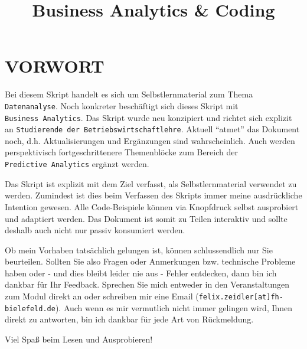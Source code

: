 \documentclass[
  letterpaper,
  DIV=11]{scrreprt}
\title{Business Analytics \& Coding}
\author{}
\date{}
\renewcommand*\contentsname{Inhaltsverzeichnis}
\newcommand\contentsname{Inhaltsverzeichnis}
\begin{document}
\maketitle
\ifdefined\Shaded\renewenvironment{Shaded}{\begin{tcolorbox}[interior hidden, enhanced, frame hidden, breakable, boxrule=0pt, borderline west={3pt}{0pt}{shadecolor}, sharp corners]}{\end{tcolorbox}}\fi

\renewcommand*\contentsname{Inhaltsverzeichnis}
{
\hypersetup{linkcolor=}
\setcounter{tocdepth}{2}
\tableofcontents
}

\hypertarget{vorwort}{%
\chapter*{VORWORT}\label{vorwort}}


Bei diesem Skript handelt es sich um Selbstlernmaterial zum Thema
\texttt{Datenanalyse}. Noch konkreter beschäftigt sich dieses Skript mit
\texttt{Business\ Analytics}. Das Skript wurde neu konzipiert und
richtet sich explizit an
\texttt{Studierende\ der\ Betriebswirtschaftlehre}. Aktuell ``atmet''
das Dokument noch, d.h. Aktualisierungen und Ergänzungen sind
wahrscheinlich. Auch werden perspektivisch fortgeschrittenere
Themenblöcke zum Bereich der \texttt{Predictive\ Analytics} ergänzt
werden.

Das Skript ist explizit mit dem Ziel verfasst, als Selbstlernmaterial
verwendet zu werden. Zumindest ist dies beim Verfassen des Skripts immer
meine ausdrückliche Intention gewesen. Alle Code-Beispiele können via
Knopfdruck selbst ausprobiert und adaptiert werden. Das Dokument ist
somit zu Teilen interaktiv und sollte deshalb auch nicht nur passiv
konsumiert werden.

Ob mein Vorhaben tatsächlich gelungen ist, können schlussendlich nur Sie
beurteilen. Sollten Sie also Fragen oder Anmerkungen bzw. technische
Probleme haben oder - und dies bleibt leider nie aus - Fehler entdecken,
dann bin ich dankbar für Ihr Feedback. Sprechen Sie mich entweder in den
Veranstaltungen zum Modul direkt an oder schreiben mir eine Email
(\texttt{felix.zeidler{[}at{]}fh-bielefeld.de}). Auch wenn es mir
vermutlich nicht immer gelingen wird, Ihnen direkt zu antworten, bin ich
dankbar für jede Art von Rückmeldung.

Viel Spaß beim Lesen und Ausprobieren!
\end{document}
